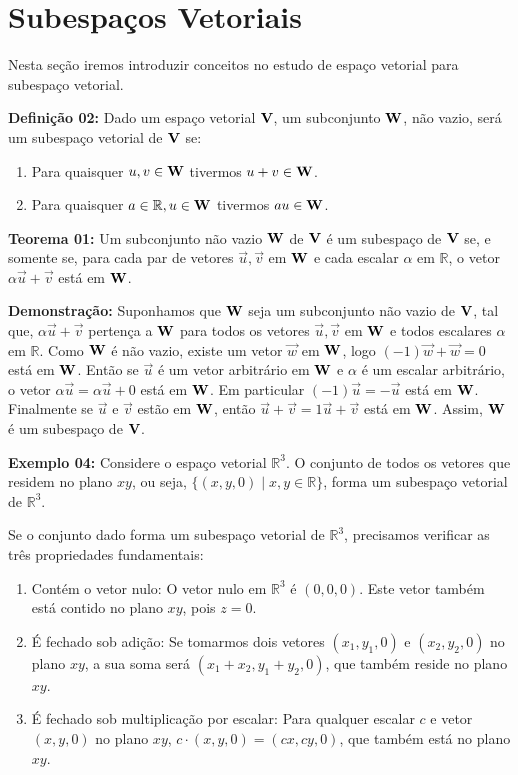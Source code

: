\section{Subespaços Vetoriais}
Nesta seção iremos introduzir conceitos no estudo de espaço vetorial para subespaço vetorial.

\noindent\textbf{Definição 02:} Dado um espaço vetorial $\vb{V}$, um subconjunto $\vb{W}$, não vazio, será um subespaço vetorial de $\vb{V}$ se:
\begin{enumerate}
	\item Para quaisquer $u, v \in \vb{W}$ tivermos $u + v \in \vb{W}$.
	\item Para quaisquer $a \in \mathbb{R}, u \in \vb{W}$ tivermos $au \in \vb{W}$.
	\end{enumerate}

\noindent\textbf{Teorema 01:} Um subconjunto não vazio $\vb{W}$ de $\vb{V}$ é um subespaço de $\vb{V}$ se, e somente se, para cada par de vetores $\vec{u}, \vec{v}$ em $\vb{W}$ e cada escalar $\alpha$ em $\mathbb{R}$, o vetor $\alpha\vec{u} + \vec{v}$ está em $\vb{W}$.

\noindent\textbf{Demonstração:} Suponhamos que $\vb{W}$ seja um subconjunto não vazio de $\vb{V}$, tal que, $\alpha\vec{u} + \vec{v}$ pertença a $\vb{W}$ para todos os vetores $\vec{u}, \vec{v}$ em $\vb{W}$ e todos escalares $\alpha$ em $\mathbb{R}$. Como $\vb{W}$ é não vazio, existe um vetor $\vec{w}$ em $\vb{W}$, logo $(-1) \vec{w} + \vec{w} = 0$ está em $\vb{W}$. Então se $\vec{u}$ é um vetor arbitrário em $\vb{W}$ e $\alpha$ é um escalar arbitrário, o vetor $\alpha\vec{u} = \alpha\vec{u} + 0$ está em $\vb{W}$. Em particular $(-1)\vec{u} = -\vec{u}$ está em $\vb{W}$. Finalmente se $\vec{u}$ e $\vec{v}$ estão em $\vb{W}$, então $\vec{u} + \vec{v} = 1\vec{u} + \vec{v}$ está em $\vb{W}$.
Assim, $\vb{W}$ é um subespaço de $\vb{V}$. \nocite{hoffman1979}

\noindent\textbf{Exemplo 04:} Considere o espaço vetorial $\mathbb{R}^3$. O conjunto de todos os vetores que residem no plano $xy$, ou seja, $\{(x, y, 0) \mid x, y \in \mathbb{R}\}$, forma um subespaço vetorial de $\mathbb{R}^3$.

Se o conjunto dado forma um subespaço vetorial de $\mathbb{R}^3$, precisamos verificar as três propriedades fundamentais:

\begin{enumerate}
    \item Contém o vetor nulo: O vetor nulo em $\mathbb{R}^3$ é $(0,0,0)$. Este vetor também está contido no plano $xy$, pois $z = 0$.
    
    \item É fechado sob adição: Se tomarmos dois vetores $(x_1, y_1, 0)$ e $(x_2, y_2, 0)$ no plano $xy$, a sua soma será $(x_1 + x_2, y_1 + y_2, 0)$, que também reside no plano $xy$.
    
    \item É fechado sob multiplicação por escalar: Para qualquer escalar $c$ e vetor $(x, y, 0)$ no plano $xy$, $c \cdot (x, y, 0) = (cx, cy, 0)$, que também está no plano $xy$.
\end{enumerate}

